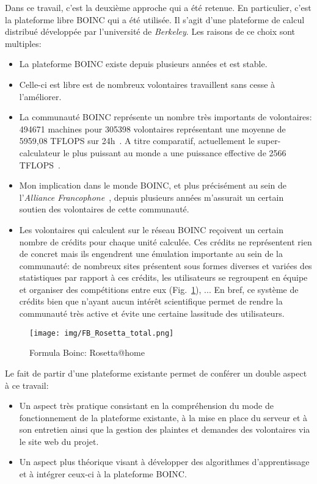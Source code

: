 \documentclass[a4paper, 11pt]{article}
\begin{document}
Dans ce travail, c'est la deuxième approche qui a été retenue. En particulier, c'est la plateforme libre \textsc{BOINC} qui a été utilisée. Il s'agit d'une plateforme de calcul distribué développée par l'université de \textit{Berkeley}. Les raisons de ce choix sont multiples:
\begin{itemize}
\item La plateforme \textsc{BOINC} existe depuis plusieurs années et est stable.
\item Celle-ci est libre est de nombreux volontaires travaillent sans cesse à l'améliorer.
\item La communauté \textsc{BOINC} représente un nombre très importants de volontaires: 494671 machines pour 305398 volontaires représentant une moyenne de 5959,08 TFLOPS sur 24h~\cite{BOINC}. A titre comparatif, actuellement le super-calculateur le plus puissant au monde a une puissance effective de 2566 TFLOPS~\cite{TOP500}.
\item Mon implication dans le monde \textsc{BOINC}, et plus précisément au sein de l'\textit{Alliance Francophone}~\cite{AF}, depuis plusieurs années m'assurait un certain soutien des volontaires de cette communauté.
\item Les volontaires qui calculent sur le réseau \textsc{BOINC} reçoivent un certain nombre de crédits pour chaque unité calculée. Ces crédits ne représentent rien de concret mais ils engendrent une émulation importante au sein de la communauté: de nombreux sites présentent sous formes diverses et variées des statistiques par rapport à ces crédits, les utilisateurs se regroupent en équipe et organiser des compétitions entre eux (Fig.~\ref{fb}), ... En bref, ce système de crédits bien que n'ayant aucun intérêt scientifique permet de rendre la communauté très active et évite une certaine lassitude des utilisateurs.
\end{itemize}

\begin{figure}[!h]
\centering
\texttt{[image: img/FB\_Rosetta\_total.png]}
\caption{Formula Boinc: Rosetta@home~\cite{SEB}}
\label{fb}
\end{figure}


Le fait de partir d'une plateforme existante permet de conférer un double aspect à ce travail:
\begin{itemize}
\item Un aspect très pratique consistant en la compréhension du mode de fonctionnement de la plateforme existante, à la mise en place du serveur et à son entretien ainsi que la gestion des plaintes et demandes des volontaires via le site web du projet.
\item Un aspect plus théorique visant à développer des algorithmes d'apprentissage et à intégrer ceux-ci à la plateforme \textsc{BOINC}.
\end{itemize}
\end{document}
